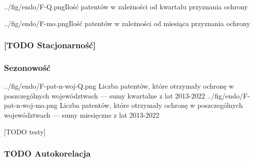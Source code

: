   \fig
{../fig/endo/F-Q.png}{Ilość patentów w zależności od kwartału przyznania ochrony}

  \fig
{../fig/endo/F-mo.png}{Ilość patentów w zależności od miesiąca przyznania ochrony}



  \subsubsection
{[TODO Stacjonarność]}




  \newpage\subsubsection
{Sezonowość}

  \figsides
{../fig/endo/F-pat-n-woj-Q.png}
{ Liczba patentów, które otrzymały ochronę w poszczególnych województwach 
  --- sumy kwartalne z lat 2013-2022 }
{../fig/endo/F-pat-n-woj-mo.png}
{ Liczba patentów, które otrzymały ochronę w poszczególnych województwach 
  --- sumy miesięczne z lat 2013-2022 }

[TODO testy]

  \subsubsection
{TODO Autokorelacja}